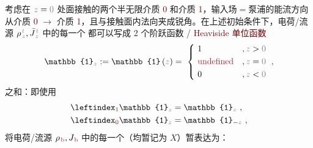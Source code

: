 考虑在 $\mathcolor{gray}{z} = \mathcolor{gray}{0}$ 处面接触的两个半无限介质 \textcolor{Maroon}{0} 和介质 \textcolor{Maroon}{1}，输入场$=$泵浦的能流方向从介质 \textcolor{Maroon}{0} $\to$ 介质 \textcolor{Maroon}{1}，且与接触面内法向夹成锐角。在上述初始条件下，电荷/流源 ${\rho}^{\;\!\mathcolor{gray}{t}}_{\;\!\mathcolor{gray}{z}}, \bar{J}^{\;\!\mathcolor{gray}{t}}_{\;\!\mathcolor{gray}{z}}$ 中的每一个 都可以写成 2 个阶跃函数 / \textcolor{Maroon}{Heaviside 单位函数}
\begin{align} \label{eq:u}
	\mathbb{1}_{\mathcolor{gray}{z}} := \mathbb{1} \left( \mathcolor{gray}{z} \right) = ~\left\{~ \begin{aligned} 
		&1 &&, \mathcolor{gray}{z \mathcolor{black}{>} 0} \\ 
		&\textcolor{Maroon}{\text{undefined}} &&, \mathcolor{gray}{z \mathcolor{black}{=} 0} \\
		&0 &&, \mathcolor{gray}{z \mathcolor{black}{<} 0} \end{aligned}\right. ~,
\end{align}
之和：即使用
\begin{subequations} \label{eq:u-01}
	\abovedisplayskip=0pt
\begin{align}
	\leftindex_{\textcolor{Maroon}{1}} {\mathbb{1}}_{\mathcolor{gray}{z}} &= {\mathbb{1}}_{\mathcolor{gray}{z}} ~, \label{eq:u-1} \\ 
	\leftindex_{\textcolor{Maroon}{0}} {\mathbb{1}}_{\mathcolor{gray}{z}} &= {\mathbb{1}}_{ - \mathcolor{gray}{z} } ~, \label{eq:u-0}
\end{align}
\end{subequations}
将电荷/流源 $\rho_{\;\!\textcolor{Maroon}{\text{b}}}, J_{\;\!\textcolor{Maroon}{\text{b}}}$ 中的每一个（均暂记为 $X$）暂表达为：
